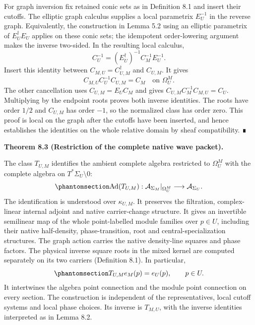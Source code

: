 \documentclass[
  english,
  11pt,
  reqno]{amsart}
\makeatletter
\newcommand{\pandocstatementheading}[1]{%
  \par\if@nobreak\else
    \addpenalty{\@beginparpenalty}%
    \addvspace{.5\baselineskip plus .2\baselineskip minus .2\baselineskip}%
  \fi
  {\normalfont\bfseries #1\par}%
  \nobreak\@afterindenttrue\@afterheading
}
\makeatother
\begin{document}
For graph inversion fix retained conic sets as in Definition 8.1 and
insert their cutoffs. The elliptic graph calculus supplies a local
parametrix \(E_U^{-1}\) in the reverse graph. Equivalently, the
construction in Lemma 5.2 using an elliptic parametrix of
\(E_U^{\dagger}E_U\) applies on these conic sets; the idempotent
order-lowering argument makes the inverse two-sided. In the resulting
local calculus, \[
C_U^{-1}
=(E_U^{\dagger})^{-1}C_M^{-1}E_U^{-1}.
\] Insert this identity between \(C_{M,U}=C_{U,M}^{\dagger}\) and
\(C_{U,M}\). It gives \[
C_{M,U}C_U^{-1}C_{U,M}=C_M
\quad\text{on }\Omega_U^M.
\] The other cancellation uses \(C_{U,M}=E_UC_M\) and gives
\(C_{U,M}C_M^{-1}C_{M,U}=C_U\). Multiplying by the endpoint roots proves
both inverse identities. The roots have order \(1/2\) and \(C_{U,M}\)
has order \(-1\), so the normalized class has order zero. This proof is
local on the graph after the cutoffs have been inserted, and hence
establishes the identities on the whole relative domain by sheaf
compatibility. ∎

\pandocstatementheading{\protect{}\label{thm:relative-wave-packet-comparison}Theorem 8.3 (Restriction of the complete native wave packet).}

The class \(T_{U,M}\) identifies the ambient complete algebra restricted
to \(\Omega_U^M\) with the complete algebra on
\(T^*\Sigma_U\setminus0\):
\begin{equation}\protect\phantomsection\label{eq:relative-algebra-comparison}{
\operatorname{Ad}(T_{U,M}):
\mathcal A_{\Sigma_M}|_{\Omega_U^M}
\longrightarrow \mathcal A_{\Sigma_U}.
}\end{equation} The identification is understood over \(\kappa_{U,M}\).
It preserves the filtration, complex-linear internal adjoint and native
carrier-change structure. It gives an invertible semilinear map of the
whole point-labelled module families over \(p\in U\), including their
native half-density, phase-transition, root and central-specialization
structures. The graph action carries the native density-line squares and
phase factors. The physical inverse square roots in the mixed kernel are
computed separately on its two carriers (Definition 8.1). In particular,
\begin{equation}\protect\phantomsection\label{eq:relative-full-evaluation}{
T_{U,M}e_M(p)=e_U(p),\qquad p\in U.
}\end{equation} It intertwines the algebra point connection and the
module point connection on every section. The construction is
independent of the representatives, local cutoff systems and local phase
choices. Its inverse is \(T_{M,U}\), with the inverse identities
interpreted as in Lemma 8.2.
\end{document}
